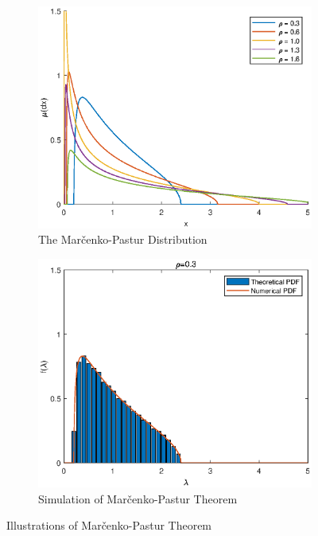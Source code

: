 \begin{figure}[htbp]
    \centering
    \begin{subfigure}{.49\linewidth}
        \includegraphics[width=\textwidth]{random-matrix-theory/figures/marchenko-pastur-distribution.eps}
        \caption{The Marčenko-Pastur Distribution}
    \end{subfigure}
    \begin{subfigure}{.49\linewidth}
        \includegraphics[width=\textwidth]{random-matrix-theory/figures/marchenko-pastur-theorem-simulation.eps}
        \caption{Simulation of Marčenko-Pastur Theorem}
    \end{subfigure}
    \caption{Illustrations of Marčenko-Pastur Theorem}
\end{figure}

